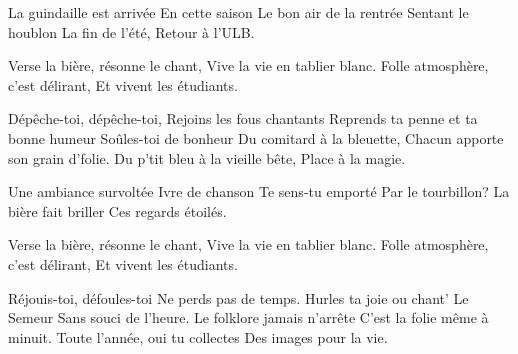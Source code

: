 \footnotemark [
ititle={Atmosphere de guindaille},
tu={Le printemps (Michel Fugain)}]


\beginverse
La guindaille est arrivée
En cette saison
Le bon air de la rentrée
Sentant le houblon
La fin de l'été,
Retour à l'ULB.
\endverse

\beginverse
Verse la bière, résonne le chant,
Vive la vie en tablier blanc.
Folle atmosphère, c'est délirant,
Et vivent les étudiants.
\endverse

\beginverse
Dépêche-toi, dépêche-toi,
Rejoins les fous chantants
Reprends ta penne et ta bonne humeur
Soûles-toi de bonheur
Du comitard à la bleuette,
Chacun apporte son grain d'folie.
Du p'tit bleu à la vieille bête,
Place à la magie.
\endverse

\beginchorus
{}
\endchorus

\beginverse
Une ambiance survoltée
Ivre de chanson
Te sens-tu emporté
Par le tourbillon?
La bière fait briller
Ces regards étoilés.
\endverse

\beginverse
Verse la bière, résonne le chant,
Vive la vie en tablier blanc.
Folle atmosphère, c'est délirant,
Et vivent les étudiants.
\endverse

\beginverse
Réjouis-toi, défoules-toi
Ne perds pas de temps.
Hurles ta joie ou chant' Le Semeur
Sans souci de l'heure.
Le folklore jamais n'arrête
C'est la folie même à minuit.
Toute l'année, oui tu collectes
Des images pour la vie.
\endverse

\beginchorus
{}
\endchorus
\endsong